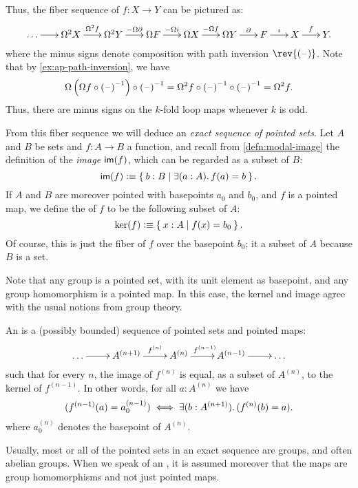 Thus, the fiber sequence of $f:X\to Y$ can be pictured as:
\[\xymatrix@C=1.5pc{
  \dots \ar[r] &
  \Omega^2 X \ar[r]^-{\Omega^2 f} &
  \Omega^2 Y \ar[r]^-{-\Omega \partial} &
  \Omega F \ar[r]^-{-\Omega i} &
  \Omega X \ar[r]^-{-\Omega f} &
  \Omega Y \ar[r]^-{\partial} &
  F \ar[r]^-{i} &
  X \ar[r]^{f} & Y.}\]
where the minus signs denote composition with path inversion $\rev{(\blank)}$.
Note that by \autoref{ex:ap-path-inversion}, we have
\[ \Omega\left(\Omega f\circ \mathord{{(\mathord{\hspace{1pt}\text{--}\hspace{1pt}})}^{-1}}\right) \circ \mathord{{(\mathord{\hspace{1pt}\text{--}\hspace{1pt}})}^{-1}}
= \Omega^2 f \circ \mathord{{(\mathord{\hspace{1pt}\text{--}\hspace{1pt}})}^{-1}} \circ \mathord{{(\mathord{\hspace{1pt}\text{--}\hspace{1pt}})}^{-1}}
= \Omega^2 f.
\]
Thus, there are minus signs on the $k$-fold loop maps whenever $k$ is odd.

From this fiber sequence we will deduce an \emph{exact sequence of pointed sets}.
%
Let $A$ and $B$ be sets and $f:A\to B$ a function, and recall from \autoref{defn:modal-image} the definition of the \emph{image} $\mathsf{im}(f)$, which can be regarded as a subset of $B$:
\[\im(f) \defeq \setof{b:B | \exis{a:A} f(a)=b}. \]
If $A$ and $B$ are moreover pointed with basepoints $a_0$ and $b_0$, and $f$ is a pointed map, we define the 
%
%
of $f$ to be the following subset of $A$:
\[\ker(f) \vcentcolon\equiv \Set{x:A | f(x) = b_0}. \]
Of course, this is just the fiber of $f$ over the basepoint $b_0$; it a subset of $A$ because $B$ is a set.

Note that any group is a pointed set, with its unit element as basepoint, and any group homomorphism is a pointed map.
In this case, the kernel and image agree with the usual notions from group theory.

\begin{defn}
  An 
  is a (possibly bounded) sequence of pointed sets and pointed maps:
  \[\xymatrix{\dots \ar[r] & A^{(n+1)} \ar[r]^-{f^{(n)}} & A^{(n)} \ar[r]^{f^{(n-1)}} & A^{(n-1)} \ar[r] &
    \dots}\]
  such that for every $n$, the image of $f^{(n)}$ is equal, as a subset of $A^{(n)}$, to the kernel of $f^{(n-1)}$.
  In other words, for all $a:A^{(n)}$ we have
  \[ (f^{(n-1)}(a) = a^{(n-1)}_0) \iff \exis{b:A^{(n+1)}} (f^{(n)}(b)=a). \]
  where $a^{(n)}_0$ denotes the basepoint of $A^{(n)}$.
\end{defn}

Usually, most or all of the pointed sets in an exact sequence are groups, and often abelian groups.
When we speak of an , it is assumed moreover that the maps are group homomorphisms and not just pointed maps.

